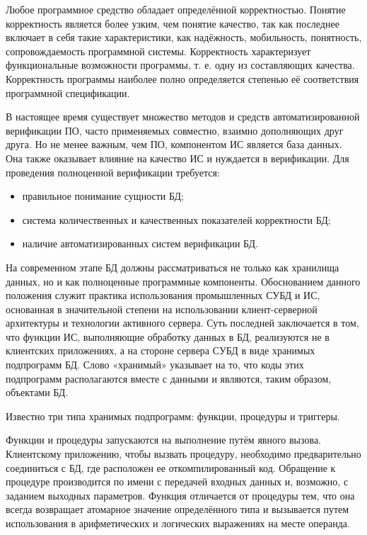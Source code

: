 Любое программное средство обладает определённой корректностью. Понятие корректность является более узким,
чем понятие качество, так как последнее включает в себя такие характеристики, как надёжность, мобильность,
понятность, сопровождаемость программной системы. Корректность характеризует функциональные возможности программы,
т. е. одну из составляющих качества. Корректность программы наиболее полно определяется степенью её соответствия
программной спецификации.

В настоящее время существует множество методов и средств автоматизированной верификации ПО, часто применяемых
совместно, взаимно дополняющих друг друга. Но не менее важным, чем ПО, компонентом ИС является база данных.
Она также оказывает влияние на качество ИС и нуждается в верификации. Для проведения полноценной
верификации требуется:
\begin{itemize}
    \item правильное понимание сущности БД;

    \item система количественных и качественных показателей корректности БД;

    \item наличие автоматизированных систем верификации БД.
\end{itemize}

На современном этапе БД должны рассматриваться не только как хранилища данных, но и как полноценные программные
компоненты. Обоснованием данного положения служит практика использования промышленных СУБД и ИС, основанная
в значительной степени на использовании клиент-серверной архитектуры и технологии активного сервера. Суть последней
заключается в том, что функции ИС, выполняющие обработку данных в БД, реализуются не в клиентских приложениях, а
на стороне сервера СУБД в виде хранимых подпрограмм БД. Слово «хранимый» указывает на то, что коды этих подпрограмм
располагаются вместе с данными и являются, таким образом, объектами БД.

Известно три типа хранимых подпрограмм: функции, процедуры и триггеры.

Функции и процедуры запускаются на выполнение путём явного вызова. Клиентскому приложению, чтобы вызвать процедуру,
необходимо предварительно соединиться с БД, где расположен ее откомпилированный код. Обращение к процедуре
производится по имени с передачей входных данных и, возможно, с заданием выходных параметров. Функция отличается
от процедуры тем, что она всегда возвращает атомарное значение определённого типа и вызывается путем использования
в арифметических и логических выражениях на месте операнда.


